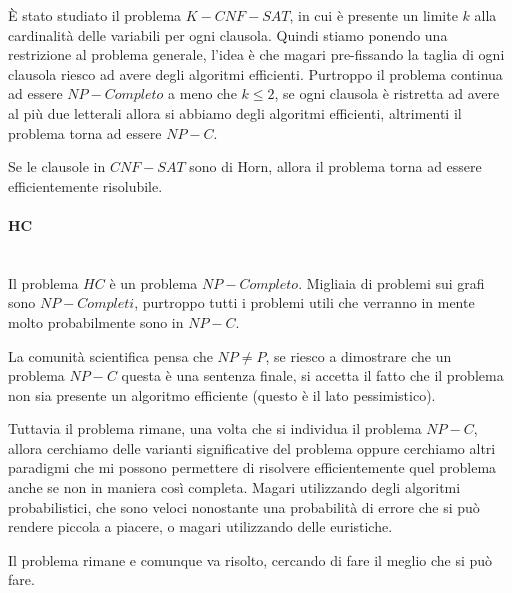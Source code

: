 \documentclass{article}
\begin{document}
È stato studiato il problema $K-CNF-SAT$, in cui è presente un limite $k$ alla cardinalità
delle variabili per ogni clausola. Quindi stiamo ponendo una restrizione al problema
generale, l'idea è che magari pre-fissando la taglia di ogni clausola riesco ad avere
degli algoritmi efficienti. Purtroppo il problema continua ad essere $NP-Completo$ a meno
che $k\leq 2$, se ogni clausola è ristretta ad avere al più due letterali allora si abbiamo
degli algoritmi efficienti, altrimenti il problema torna ad essere $NP-C$.

Se le clausole in $CNF-SAT$ sono di Horn, allora il problema torna ad essere efficientemente
risolubile.

\paragraph{HC}\mbox{}\\
Il problema $HC$ è un problema $NP-Completo$. Migliaia di problemi sui grafi sono
$NP-Completi$, purtroppo tutti i problemi utili che verranno in mente molto probabilmente
sono in $NP-C$.

La comunità scientifica pensa che $NP\neq P$, se riesco a dimostrare che un problema
$NP-C$ questa è una sentenza finale, si accetta il fatto che il problema non sia presente
un algoritmo efficiente (questo è il lato pessimistico).

Tuttavia il problema rimane, una volta che si individua il problema $NP-C$, allora cerchiamo
delle varianti significative del problema oppure cerchiamo altri paradigmi che mi possono
permettere di risolvere efficientemente quel problema anche se non in maniera così completa.
Magari utilizzando degli algoritmi probabilistici, che sono veloci nonostante una probabilità
di errore che si può rendere piccola a piacere, o magari utilizzando delle euristiche.

Il problema rimane e comunque va risolto, cercando di fare il meglio che si può fare.
\end{document}
